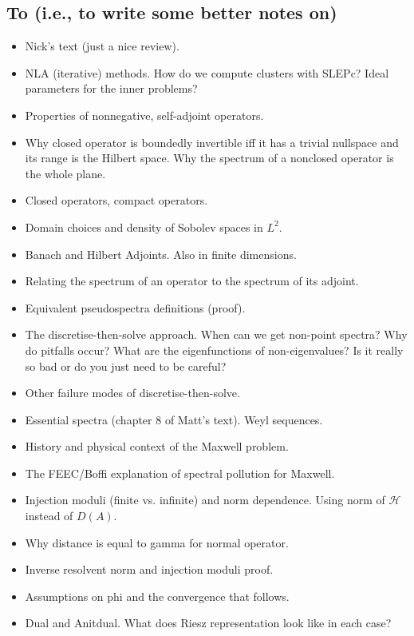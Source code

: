 \documentclass[12pt,a4paper]{article}
\begin{document}
\subsection{To  (i.e., to write some better notes on)}

\begin{itemize}
    \item Nick's text (just a nice review).
    \item NLA (iterative) methods. How do we compute clusters with SLEPc? Ideal parameters for the inner problems?
    \item Properties of nonnegative, self-adjoint operators.
    \item Why closed operator is boundedly invertible iff it has a trivial nullspace and its range is the Hilbert space. Why the spectrum of a nonclosed operator is the whole plane. 
    \item Closed operators, compact operators. 
    \item Domain choices and density of Sobolev spaces in $L^2.$
    \item Banach and Hilbert Adjoints. Also in finite dimensions.
    \item Relating the spectrum of an operator to the spectrum of its adjoint. 
    \item Equivalent pseudospectra definitions (proof). 
    \item The discretise-then-solve approach. When can we get non-point spectra? Why do pitfalls occur? What are the eigenfunctions of non-eigenvalues? Is it really so bad or do you just need to be careful?
    \item Other failure modes of discretise-then-solve.
    \item Essential spectra (chapter 8 of Matt's text). Weyl sequences. 
    \item History and physical context of the Maxwell problem.
    \item The FEEC/Boffi explanation of spectral pollution for Maxwell. 
    \item Injection moduli (finite vs. infinite) and norm dependence. Using norm of $\mathcal{H}$ instead of $D(A).$
    \item Why distance is equal to gamma for normal operator. 
    \item Inverse resolvent norm and injection moduli proof. 
    \item Assumptions on phi and the convergence that follows. 
    \item Dual and Anitdual. What does Riesz representation look like in each case?

\end{itemize}
\end{document}
